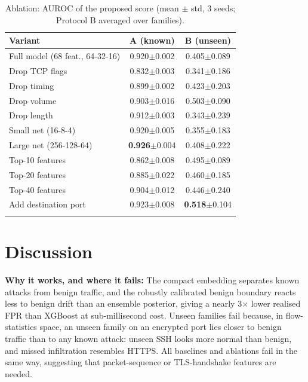 \documentclass[pdflatex,sn-mathphys-num,iicol]{sn-jnl}%
\begin{document}
\begin{table}[t]
\caption{Ablation: AUROC of the proposed score (mean $\pm$ std, 3 seeds; Protocol B averaged over families).}\label{tab:ablation}
\footnotesize
\setlength{\tabcolsep}{2.5pt}
\begin{tabular}{@{}lcc@{}}
\toprule
Variant & A (known) & B (unseen) \\
\midrule
Full model (68 feat., 64-32-16) & 0.920$\pm$0.002 & 0.405$\pm$0.089 \\
Drop TCP flags & 0.832$\pm$0.003 & 0.341$\pm$0.186 \\
Drop timing & 0.899$\pm$0.002 & 0.423$\pm$0.203 \\
Drop volume & 0.903$\pm$0.016 & 0.503$\pm$0.090 \\
Drop length & 0.912$\pm$0.003 & 0.343$\pm$0.239 \\
Small net (16-8-4) & 0.920$\pm$0.005 & 0.355$\pm$0.183 \\
Large net (256-128-64) & \textbf{0.926}$\pm$0.004 & 0.408$\pm$0.222 \\
Top-10 features & 0.862$\pm$0.008 & 0.495$\pm$0.089 \\
Top-20 features & 0.885$\pm$0.022 & 0.460$\pm$0.185 \\
Top-40 features & 0.904$\pm$0.012 & 0.446$\pm$0.240 \\
Add destination port & 0.923$\pm$0.008 & \textbf{0.518}$\pm$0.104 \\
\botrule
\end{tabular}
\end{table}

\section{Discussion}\label{sec:discussion}

\textbf{Why it works, and where it fails:} The compact embedding separates known attacks from benign traffic, and the robustly calibrated benign boundary reacts less to benign drift than an ensemble posterior, giving a nearly 3$\times$ lower realised FPR than XGBoost at sub-millisecond cost. Unseen families fail because, in flow-statistics space, an unseen family on an encrypted port lies closer to benign traffic than to any known attack: unseen SSH looks more normal than benign, and missed infiltration resembles HTTPS. All baselines and ablations fail in the same way, suggesting that packet-sequence or TLS-handshake features are needed.
\end{document}
